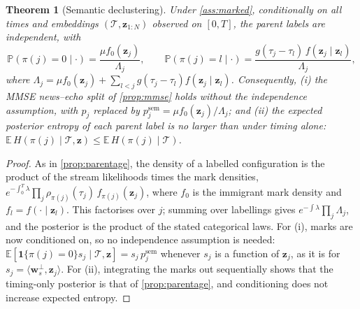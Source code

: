 \documentclass[11pt,a4paper]{article}
\theoremstyle{plain}
\newtheorem{theorem}{Theorem}[section]
\theoremstyle{definition}
\theoremstyle{remark}
\newcommand{\E}{\mathbb{E}}
\newcommand{\Prob}{\mathbb{P}}
\newcommand{\z}{\bm{z}}
\newcommand{\w}{\bm{w}}
\newcommand{\ind}{\mathbf{1}}
\begin{document}
\begin{theorem}[Semantic declustering]\label{thm:semantic}
Under \cref{ass:marked}, conditionally on all times and embeddings $(\mathcal{T},\z_{1:N})$ observed on $[0,T]$, the parent labels are independent, with
\[
  \Prob(\pi(j)=0\mid\cdot)=\frac{\mu f_0(\z_j)}{\Lambda_j},\qquad
  \Prob(\pi(j)=l\mid\cdot)=\frac{g(\tau_j-\tau_l)\,f(\z_j\mid\z_l)}{\Lambda_j},
\]
where $\Lambda_j=\mu f_0(\z_j)+\sum_{l<j}g(\tau_j-\tau_l)f(\z_j\mid\z_l)$.
Consequently, (i) the MMSE news--echo split of \cref{prop:mmse} holds \emph{without} the independence assumption, with $p_j$ replaced by $p_j^{\text{sem}}=\mu f_0(\z_j)/\Lambda_j$; and (ii) the expected posterior entropy of each parent label is no larger than under timing alone: $\E\,H(\pi(j)\mid\mathcal{T},\z)\le\E\,H(\pi(j)\mid\mathcal{T})$.
\end{theorem}
\begin{proof}
As in \cref{prop:parentage}, the density of a labelled configuration is the product of the stream likelihoods times the mark densities, $e^{-\int_0^T\lambda}\prod_j\rho_{\pi(j)}(\tau_j)\,f_{\pi(j)}(\z_j)$, where $f_0$ is the immigrant mark density and $f_l=f(\cdot\mid\z_l)$. This factorises over $j$; summing over labellings gives $e^{-\int\lambda}\prod_j\Lambda_j$, and the posterior is the product of the stated categorical laws. For (i), marks are now conditioned on, so no independence assumption is needed: $\E[\ind\{\pi(j)=0\}s_j\mid\mathcal{T},\z]=s_j\,p^{\text{sem}}_j$ whenever $s_j$ is a function of $\z_j$, as it is for $s_j=\langle\w_s^\perp,\z_j\rangle$. For (ii), integrating the marks out sequentially shows that the timing-only posterior is that of \cref{prop:parentage}, and conditioning does not increase expected entropy.
\end{proof}
\end{document}
